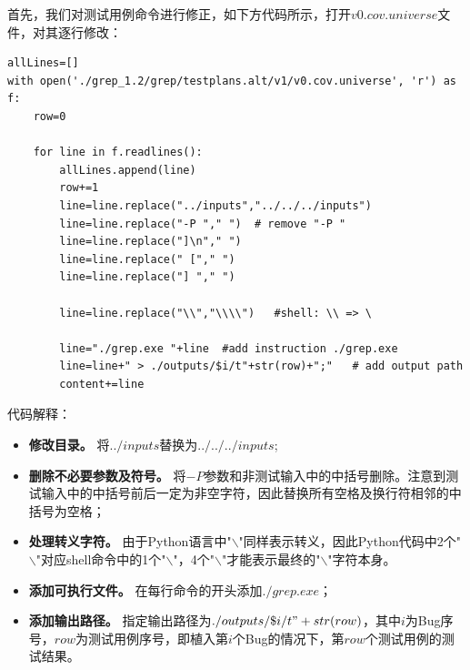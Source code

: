 \documentclass[12pt, a4paper, oneside,bibend=bibtex]{ctexart}
\begin{document}
首先，我们对测试用例命令进行修正，如下方代码所示，打开$v0.cov.universe$文件，对其逐行修改：
\begin{lstlisting}[caption={handle.sh pt.2}]
allLines=[]
with open('./grep_1.2/grep/testplans.alt/v1/v0.cov.universe', 'r') as f:
    row=0

    for line in f.readlines():
        allLines.append(line)
        row+=1
        line=line.replace("../inputs","../../../inputs")
        line=line.replace("-P "," ")  # remove "-P "
        line=line.replace("]\n"," ")
        line=line.replace(" ["," ")
        line=line.replace("] "," ")

        line=line.replace("\\","\\\\")   #shell: \\ => \

        line="./grep.exe "+line  #add instruction ./grep.exe
        line=line+" > ./outputs/$i/t"+str(row)+";"   # add output path
        content+=line
\end{lstlisting}
代码解释：
\begin{itemize}
    \item \textbf{修改目录。} 将$../inputs$替换为$../../../inputs$;
    \item \textbf{删除不必要参数及符号。} 将$-P$参数和非测试输入中的中括号删除。注意到测试输入中的中括号前后一定为非空字符，因此替换所有空格及换行符相邻的中括号为空格；
    \item \textbf{处理转义字符。} 由于Python语言中"$\backslash$"同样表示转义，因此Python代码中2个"$\backslash$"对应shell命令中的1个"$\backslash$"，4个"$\backslash$"才能表示最终的"$\backslash$"字符本身。
    \item \textbf{添加可执行文件。} 在每行命令的开头添加$./grep.exe$；
    \item \textbf{添加输出路径。} 指定输出路径为$./outputs/\$i/t"+str(row)$，其中$i$为Bug序号，$row$为测试用例序号，即植入第$i$个Bug的情况下，第$row$个测试用例的测试结果。
\end{itemize}
\end{document}
